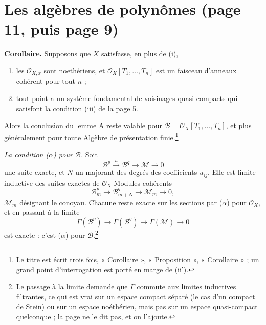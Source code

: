\documentclass[11pt,a4paper]{article}
\begin{document}
\section*{Les algèbres de polynômes (page 11, puis page 9)}

\textbf{Corollaire.} Supposons que $X$ satisfasse, en plus de (i),
\begin{enumerate}
\item[(ii')] les $\mathcal{O}_{X,x}$ sont noethériens, et
$\mathcal{O}_{X}[T_{1}, \ldots, T_{n}]$ est un faisceau d'anneaux cohérent
pour tout $n$ ;
\item[(iii')] tout point a un système fondamental de voisinages quasi-compacts
qui satisfont la condition (iii) de la page 5.
\end{enumerate}
Alors la conclusion du lemme A reste valable pour
$\mathcal{B} = \mathcal{O}_{X}[T_{1}, \ldots, T_{n}]$, et plus généralement
pour toute Algèbre de présentation finie.\footnote{Le titre est écrit trois
fois, « Corollaire », « Proposition », « Corollaire » ; un grand point
d'interrogation est porté en marge de (ii').}

\emph{La condition ($\alpha$) pour $\mathcal{B}$.} Soit
\[
  \mathcal{B}^{p} \xrightarrow{u} \mathcal{B}^{q} \to \mathcal{M} \to 0
\]
une suite exacte, et $N$ un majorant des degrés des coefficients $u_{ij}$. Elle
est limite inductive des suites exactes de $\mathcal{O}_{X}$-Modules
cohérents
\[
  \mathcal{B}_{m}^{p} \to \mathcal{B}_{m+N}^{q} \to \mathcal{M}_{m} \to 0 ,
\]
$\mathcal{M}_{m}$ désignant le conoyau. Chacune reste exacte sur les sections
par ($\alpha$) pour $\mathcal{O}_{X}$, et en passant à la limite
\[
  \Gamma(\mathcal{B}^{p}) \to \Gamma(\mathcal{B}^{q}) \to \Gamma(\mathcal{M}) \to 0
\]
est exacte : c'est ($\alpha$) pour $\mathcal{B}$.\footnote{Le passage à la
limite demande que $\Gamma$ commute aux limites inductives filtrantes, ce qui
est vrai sur un espace compact séparé (le cas d'un compact de Stein) ou
sur un espace noéthérien, mais pas sur un espace quasi-compact quelconque ;
la page ne le dit pas, et on l'ajoute.}
\end{document}
